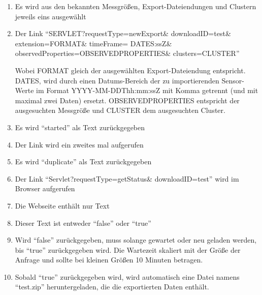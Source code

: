 \begin{enumerate}
\item Es wird aus den bekannten Messgrößen, Export-Dateiendungen und Clustern jeweils eins ausgewählt
\item Der Link ``SERVLET?requestType=newExport\& downloadID=test\& extension=FORMAT\& timeFrame= DATES:ssZ\& observedProperties=\newline OBSERVEDPROPERTIES\& clusters=CLUSTER''
\par
Wobei FORMAT gleich der ausgewählten Export-Dateiendung entspricht. DATES, wird durch einen Datums-Bereich der zu importierenden Sensor-Werte im Format YYYY-MM-DDThh:mm:ssZ mit Komma getrennt (und mit maximal zwei Daten) ersetzt. OBSERVEDPROPERTIES entspricht der ausgesuchten Messgröße und CLUSTER dem ausgesuchten Cluster.
\item Es wird ``started'' als Text zurückgegeben
\item Der Link wird ein zweites mal aufgerufen
\item Es wird ``duplicate'' als Text zurückgegeben
\item Der Link ``Servlet?requestType=getStatus\& downloadID=test'' wird im Browser aufgerufen
\item Die Webseite enthält nur Text
\item Dieser Text ist entweder ``false'' oder ``true''
\item Wird ``false'' zurückgegeben, muss solange gewartet oder neu geladen werden, bis ``true'' zurückgegeben wird. 
\newline
Die Wartezeit skaliert mit der Größe der Anfrage und sollte bei kleinen Größen 10 Minuten betragen.
\item Sobald ``true'' zurückgegeben wird, wird automatisch eine Datei namens ``test.zip'' heruntergeladen, die die exportierten Daten enthält.
\end{enumerate}
\szenarioGood